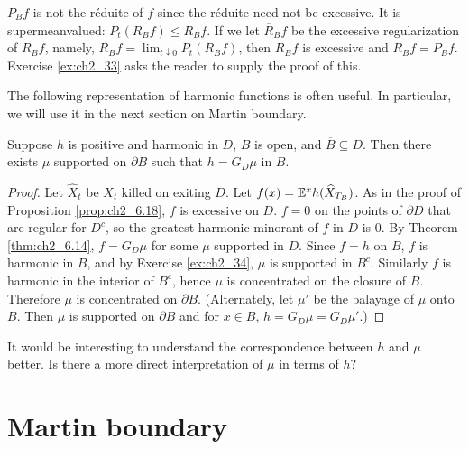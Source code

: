 $P_Bf$ is not the r\'eduite of $f$ since the r\'eduite need not be excessive. It is supermeanvalued: $P_t(R_Bf) \leq R_Bf$. If we let $\overline{R}_Bf$ be the excessive regularization of $R_Bf$, namely, $\overline{R}_Bf = \lim_{t\downarrow 0} P_t(R_Bf)$, then $\overline{R}_Bf$ is excessive and $\overline{R}_Bf = P_Bf$. Exercise \ref{ex:ch2_33} asks the reader to supply the proof of this.

The following representation of harmonic functions is often useful. In particular, we will use it in the next section on Martin boundary.

\begin{proposition}\label{prop:ch2_6.19}
Suppose $h$ is positive and harmonic in $D$, $B$ is open, and $\overline{B} \subseteq D$. Then there exists $\mu$ supported on $\partial B$ such that $h = G_D\mu$ in $B$.
\end{proposition}

\begin{proof}
Let $\widehat{X}_t$ be $X_t$ killed on exiting $D$. Let $f(x) = \mathbb{E}^xh(\widehat{X}_{T_B})$. As in the proof of Proposition \ref{prop:ch2_6.18}, $f$ is excessive on $D$. $f = 0$ on the points of $\partial D$ that are regular for $D^c$, so the greatest harmonic minorant of $f$ in $D$ is $0$. By Theorem \ref{thm:ch2_6.14}, $f = G_D\mu$ for some $\mu$ supported in $D$. Since $f = h$ on $B$, $f$ is harmonic in $B$, and by Exercise \ref{ex:ch2_34}, $\mu$ is supported in $B^c$. Similarly $f$ is harmonic in the interior of $B^c$, hence $\mu$ is concentrated on the closure of $B$. Therefore $\mu$ is concentrated on $\partial B$. (Alternately, let $\mu'$ be the balayage of $\mu$ onto $B$. Then $\mu$ is supported on $\partial B$ and for $x \in B$, $h = G_D\mu = G_D\mu'$.)
\end{proof}

\mpagebreak

It would be interesting to understand the correspondence between $h$ and $\mu$ better. Is there a more direct interpretation of $\mu$ in terms of $h$?

\section{Martin boundary}\label{ch2_sec7}


